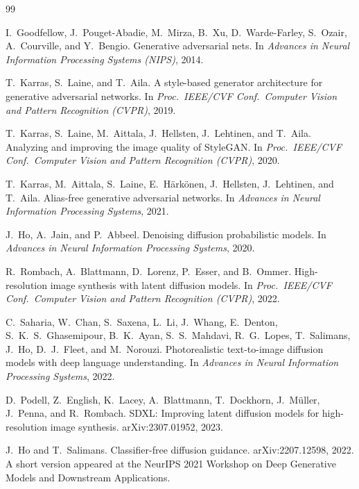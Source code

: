 \documentclass[10pt,twocolumn]{article}
\begin{document}
\begin{thebibliography}{99}
\scriptsize

I.~Goodfellow, J.~Pouget-Abadie, M.~Mirza, B.~Xu, D.~Warde-Farley, S.~Ozair, A.~Courville, and Y.~Bengio.
Generative adversarial nets.
In \emph{Advances in Neural Information Processing Systems (NIPS)}, 2014.

T.~Karras, S.~Laine, and T.~Aila.
A style-based generator architecture for generative adversarial networks.
In \emph{Proc.\ IEEE/CVF Conf.\ Computer Vision and Pattern Recognition (CVPR)}, 2019.

T.~Karras, S.~Laine, M.~Aittala, J.~Hellsten, J.~Lehtinen, and T.~Aila.
Analyzing and improving the image quality of {StyleGAN}.
In \emph{Proc.\ IEEE/CVF Conf.\ Computer Vision and Pattern Recognition (CVPR)}, 2020.

T.~Karras, M.~Aittala, S.~Laine, E.~H{\"a}rk{\"o}nen, J.~Hellsten, J.~Lehtinen, and T.~Aila.
Alias-free generative adversarial networks.
In \emph{Advances in Neural Information Processing Systems}, 2021.

J.~Ho, A.~Jain, and P.~Abbeel.
Denoising diffusion probabilistic models.
In \emph{Advances in Neural Information Processing Systems}, 2020.

R.~Rombach, A.~Blattmann, D.~Lorenz, P.~Esser, and B.~Ommer.
High-resolution image synthesis with latent diffusion models.
In \emph{Proc.\ IEEE/CVF Conf.\ Computer Vision and Pattern Recognition (CVPR)}, 2022.

C.~Saharia, W.~Chan, S.~Saxena, L.~Li, J.~Whang, E.~Denton, S.~K.~S.~Ghasemipour, B.~K.~Ayan, S.~S.~Mahdavi, R.~G.~Lopes, T.~Salimans, J.~Ho, D.~J.~Fleet, and M.~Norouzi.
Photorealistic text-to-image diffusion models with deep language understanding.
In \emph{Advances in Neural Information Processing Systems}, 2022.

D.~Podell, Z.~English, K.~Lacey, A.~Blattmann, T.~Dockhorn, J.~M{\"u}ller, J.~Penna, and R.~Rombach.
{SDXL}: Improving latent diffusion models for high-resolution image synthesis.
arXiv:2307.01952, 2023.

J.~Ho and T.~Salimans.
Classifier-free diffusion guidance.
arXiv:2207.12598, 2022.
A short version appeared at the NeurIPS 2021 Workshop on Deep Generative Models and Downstream Applications.


\end{thebibliography}
\end{document}
